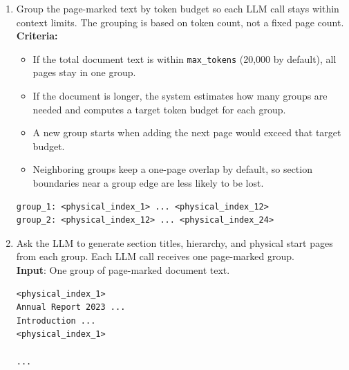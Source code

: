\documentclass[11pt,a4paper]{article}
\begin{document}
\begin{enumerate}
\begin{itemize}
\begin{enumerate}[label=(\alph*)]
\begin{lstlisting}[style=pageTextBlockInList]
<physical_index_2>
Financial Stability ...
<physical_index_2>
\end{lstlisting}
            \item Group the page-marked text by token budget so each LLM call stays within context limits. The grouping is based on token count, not a fixed page count.
\textbf{Criteria:}
\begin{itemize}
    \item If the total document text is within \texttt{max\_tokens} (20,000 by default), all pages stay in one group.
    \item If the document is longer, the system estimates how many groups are needed and computes a target token budget for each group.
    \item A new group starts when adding the next page would exceed that target budget.
    \item Neighboring groups keep a one-page overlap by default, so section boundaries near a group edge are less likely to be lost.
\end{itemize}
\begin{lstlisting}[style=pageTextBlockInList]
group_1: <physical_index_1> ... <physical_index_12>
group_2: <physical_index_12> ... <physical_index_24>
\end{lstlisting}
            \item Ask the LLM to generate section titles, hierarchy, and physical start pages from each group. Each LLM call receives one page-marked group. \\
\textbf{Input}: One group of page-marked document text.
\begin{lstlisting}[style=pageTextBlockInList]
<physical_index_1>
Annual Report 2023 ...
Introduction ...
<physical_index_1>

...


\end{lstlisting}
\end{enumerate}
\end{itemize}
\end{enumerate}
\end{document}
